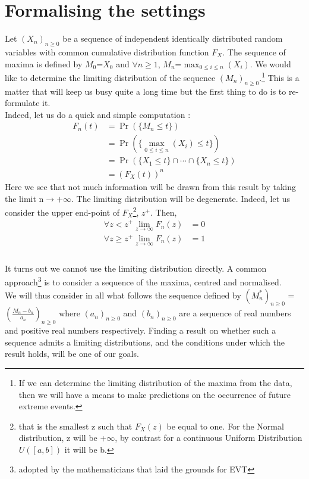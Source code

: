 \section{Formalising the settings}
Let $(X_n)_{n \ge 0}$ be a sequence of independent identically distributed random variables with common cumulative distribution function $F_X$. The sequence of maxima is defined by $M_0$=$X_0$ and $\forall n \ge 1$, $M_n$=$\max_{0 \le i \le n}(X_i)$. We would like to determine the limiting distribution of the sequence $(M_n)_{n \ge 0}$.\footnote{If we can determine the limiting distribution of the maxima from the data, then we will have a means to make predictions on the occurrence of future extreme events.} This is a matter that will keep us busy quite a long time but the first thing to do is to re-formulate it. \\ [4 pt]
Indeed, let us do a quick and simple computation :\\
\begin{equation}
\begin{aligned}
	F_n(t) &= \Pr(\{M_n \le t\}) \\
              &= \Pr(\{\max_{0 \le i \le n}(X_i) \le t\}) \\
              &= \Pr(\{X_1 \le t\} \cap \cdots \cap \{X_n \le t\}) \\
              &= (F_X(t))^n
\end{aligned}
\end{equation}
Here we see that not much information will be drawn from this result by taking the limit n$\rightarrow +\infty$. The limiting distribution will be degenerate. Indeed, let us consider the upper end-point of $F_X$\footnote{that is the smallest z such that $F_X(z)$ be equal to one. For the Normal distribution, z will be +$\infty$, by contrast for a continuous Uniform Distribution $U([a,b])$ it will be b. }, $z^{+}$. Then,
\begin{equation}
\begin{aligned}
\forall z < z^{+} \lim_{z\to\infty} F_n(z) &= 0 \\
\forall z \ge z^{+} \lim_{z\to\infty} F_n(z) &= 1 \\
\end{aligned}
\end{equation}
\\[4 pt]
It turns out we cannot use the limiting distribution directly. A common approach\footnote{adopted by the mathematicians that laid the grounds for EVT} is to consider a sequence of the maxima, centred and normalised.\\[4 pt] 
We will thus consider in all what follows the sequence defined by $(M^{*}_n)_{n \ge 0}$ = $(\frac{M_n - b_n}{a_n})_{n \ge 0}$ where $(a_n)_{n \ge 0}$ and $(b_n)_{n \ge 0}$ are a sequence of real numbers and positive real numbers respectively. Finding a result on whether such a sequence admits a limiting distributions, and the conditions under which the result holds, will be one of our goals.


